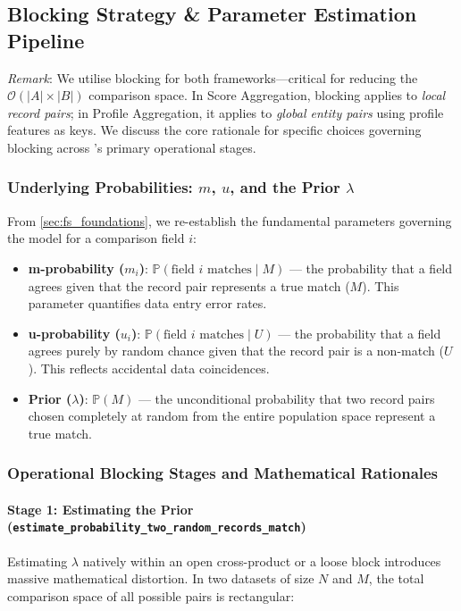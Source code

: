 \subsection{Blocking Strategy \& Parameter Estimation Pipeline}
\label{sec:blocking_theory}

\textit{Remark}: We utilise blocking for both frameworks—critical for reducing the $\mathcal{O}(|A| \times |B|)$ comparison space. In Score Aggregation, blocking applies to \textit{local record pairs}; in Profile Aggregation, it applies to \textit{global entity pairs} using profile features as keys. We discuss the core rationale for specific choices governing blocking across \splink{}'s primary operational stages.

\subsubsection{Underlying Probabilities: $m$, $u$, and the Prior $\lambda$}
From \ref{sec:fs_foundations}, we re-establish the fundamental parameters governing the \fellegisunter{} model for a comparison field $i$:
\begin{itemize}
	\item \textbf{m-probability ($m_i$)}: $\mathbb{P}(\text{field } i \text{ matches} \mid M)$ — the probability that a field agrees given that the record pair represents a true match ($M$). This parameter quantifies data entry error rates.
	\item \textbf{u-probability ($u_i$)}: $\mathbb{P}(\text{field } i \text{ matches} \mid U)$ — the probability that a field agrees purely by random chance given that the record pair is a non-match ($U$). This reflects accidental data coincidences.
	\item \textbf{Prior ($\lambda$)}: $\mathbb{P}(M)$ — the unconditional probability that two record pairs chosen completely at random from the entire population space represent a true match.
\end{itemize}

\subsubsection{Operational Blocking Stages and Mathematical Rationales}

\paragraph{Stage 1: Estimating the Prior (\texttt{estimate\_probability\_two\_random\_records\_match})}
Estimating $\lambda$ natively within an open cross-product or a loose block introduces massive mathematical distortion. In two datasets of size $N$ and $M$, the total comparison space of all possible pairs is rectangular:

